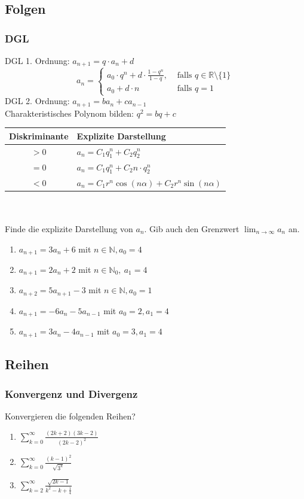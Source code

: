 \documentclass[11pt, a4paper]{article}
\begin{document}
\subsection{Folgen}
\subsubsection{DGL}
DGL 1. Ordnung: $a_{n+1} = q \cdot a_n + d$
\[a_n = \begin{cases}
	a_0 \cdot q^n + d \cdot \frac{1-q^n}{1-q}, &\text{ falls } q \in \mathbb{R} \setminus \{1\} \\
	a_0 + d \cdot n &\text{ falls } q=1
\end{cases}\]
DGL 2. Ordnung: $a_{n+1} = b a_n + c a_{n-1}$ \\
Charakteristisches Polynom bilden: $q^2 = bq+c$ \\
\begin{tabular}{|c|l|}
	\hline
	Diskriminante & Explizite Darstellung \\ \hline
	$>0$ & $a_n = C_1 q_1^n + C_2 q_2^n$ \\
	$=0$ & $a_n = C_1 q_1^n + C_2 n \cdot q_2^n$ \\
	$<0$ & $a_n = C_1 r^n \cos(n\alpha) + C_2 r^n \sin(n\alpha)$ \\ \hline
\end{tabular} \\ \\
Finde die explizite Darstellung von $a_n$. Gib auch den Grenzwert $\lim_{n \rightarrow \infty} a_n$ an.
\begin{enumerate}
	\item $a_{n+1} = 3 a_n + 6$ mit $n \in \mathbb{N}, a_0 = 4$
	\item $a_{n+1} = 2 a_n +2$ mit $n \in \mathbb{N}_0,\ a_1 = 4$
	\item $a_{n+2} = 5 a_{n+1} - 3$ mit $n \in \mathbb{N}, a_0 = 1$
	\item $a_{n+1} = -6 a_{n} - 5 a_{n-1}$ mit $a_0=2, a_1=4$
	\item $a_{n+1} = 3 a_n - 4 a_{n-1}$ mit $a_0=3, a_1=4$
\end{enumerate}

\subsection{Reihen}
\subsubsection{Konvergenz und Divergenz}
Konvergieren die folgenden Reihen?
\begin{enumerate}
	\item $\sum_{k=0}^\infty \frac{(2k+2)(3k-2)}{(2k-2)^2}$
	\item $\sum_{k=0}^\infty \frac{(k-1)^2}{\sqrt{3^k}}$
	\item $\sum_{k=2}^\infty \frac{\sqrt{2k-1}}{k^2-k+\frac{1}{4}}$
\end{enumerate}
\end{document}
